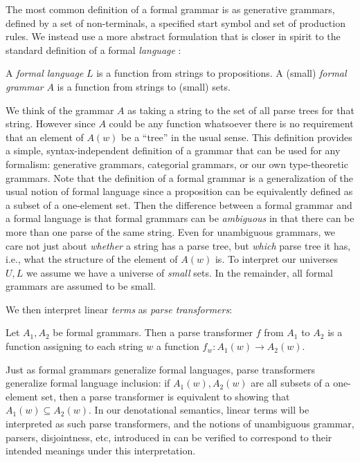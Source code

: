 \documentclass[acmsmall,nonacm]{acmart}
\begin{document}
The most common definition of a formal grammar is as generative
grammars, defined by a set of non-terminals, a specified start symbol
and set of production rules. We instead use a more abstract
formulation that is closer in spirit to the standard definition of a
formal \emph{language} \cite{elliottSymbolicAutomaticDifferentiation2021}:
\begin{definition}
  A \emph{formal language} $L$ is a function from strings to propositions.
  A (small) \emph{formal grammar} $A$ is a function from strings to (small) sets.
\end{definition}
We think of the grammar $A$ as taking a string to the set of all parse
trees for that string. However since $A$ could be any function
whatsoever there is no requirement that an element of $A(w)$ be a
``tree'' in the usual sense. This definition provides a simple,
syntax-independent definition of a grammar that can be used for any
formalism: generative grammars, categorial grammars, or our own
type-theoretic grammars. Note that the definition of a formal grammar
is a generalization of the usual notion of formal language since a
proposition can be equivalently defined as a subset of a one-element
set. Then the difference between a formal grammar and a formal
language is that formal grammars can be \emph{ambiguous} in that there
can be more than one parse of the same string. Even for unambiguous
grammars, we care not just about \emph{whether} a string has a parse
tree, but \emph{which} parse tree it has, i.e., what the structure of
the element of $A(w)$ is.  To interpret our universes $U , L$ we
assume we have a universe of \emph{small} sets. In the remainder, all
formal grammars are assumed to be small.

We then interpret linear \emph{terms} as \emph{parse transformers}:
\begin{definition}
  Let $A_1,A_2$ be formal grammars. Then a parse transformer $f$ from
  $A_1$ to $A_2$ is a function assigning to each string $w$ a function
  $f_w : A_1(w) \to A_2(w)$.
\end{definition}
Just as formal grammars generalize formal languages, parse
transformers generalize formal language inclusion: if $A_1(w), A_2(w)$
are all subsets of a one-element set, then a parse transformer is
equivalent to showing that $A_1(w) \subseteq A_2(w)$. In our
denotational semantics, linear terms will be interpreted as such parse
transformers, and the notions of unambiguous grammar, parsers,
disjointness, etc, introduced in  can be
verified to correspond to their intended meanings under this
interpretation.
\end{document}
